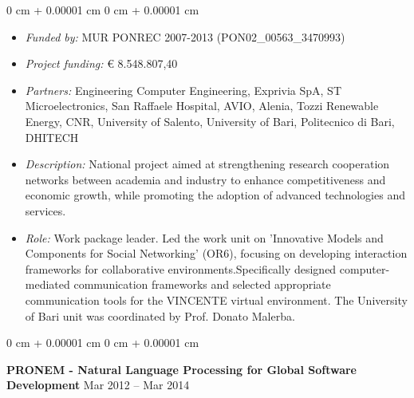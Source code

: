\documentclass[10pt, a4paper]{article}
\newenvironment{highlights}{
    \begin{itemize}[
        topsep=0.10 cm,
        parsep=0.10 cm,
        partopsep=0pt,
        itemsep=0pt,
        leftmargin=0 cm + 10pt
    ]
}{
    \end{itemize}
} %
\newenvironment{onecolentry}{
    \begin{adjustwidth}{
        0 cm + 0.00001 cm
    }{
        0 cm + 0.00001 cm
    }
}{
    \end{adjustwidth}
} %
\newenvironment{twocolentry}[2][]{
    \onecolentry
    \def\secondColumn{#2}
    \setcolumnwidth{\fill, 4.5 cm}
    \begin{paracol}{2}
}{
    \switchcolumn \raggedleft \secondColumn
    \end{paracol}
    \endonecolentry
} %
\begin{document}
        \vspace{0.10 cm}
        \begin{onecolentry}
            \begin{highlights}
                \item \textit{Funded by:} MUR PONREC 2007-2013 (PON02\_00563\_3470993)
                \item \textit{Project funding:} € 8.548.807,40
                \item \textit{Partners:} Engineering Computer Engineering, Exprivia SpA, ST Microelectronics, San Raffaele Hospital,  AVIO, Alenia, Tozzi Renewable Energy, CNR, University of Salento, University of Bari, Politecnico di Bari, DHITECH
                \item \textit{Description:} National project aimed at strengthening research cooperation networks between academia and industry to enhance competitiveness and economic growth, while promoting the adoption of advanced technologies and services.
                \item \textit{Role:} Work package leader. Led the work unit on 'Innovative Models and Components for Social Networking' (OR6), focusing on developing interaction frameworks for collaborative environments.Specifically designed computer-mediated communication frameworks and selected appropriate communication tools for the VINCENTE virtual environment. The University of Bari unit was coordinated by Prof. Donato Malerba.
            \end{highlights}
        \end{onecolentry}


        \vspace{0.2 cm}

        \begin{twocolentry}{
            Mar 2012 – Mar 2014
        }
            \textbf{PRONEM - Natural Language Processing for Global Software Development}\end{twocolentry}
\end{document}
